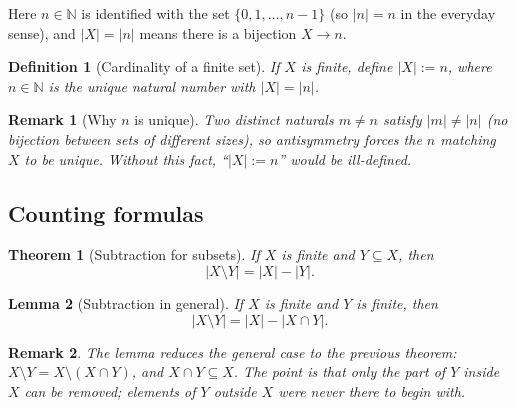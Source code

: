 \documentclass[11pt]{article}
\theoremstyle{defstyle}
\newtheorem{definition}{Definition}[section]
\theoremstyle{thmstyle}
\newtheorem{theorem}{Theorem}[section]
\newtheorem{lemma}[theorem]{Lemma}
\theoremstyle{notstyle}
\newtheorem*{remark}{Remark}
\theoremstyle{cautionstyle}
\newcommand{\N}{\mathbb{N}}
\newcommand{\card}[1]{\lvert #1 \rvert}
\begin{document}
Here $n \in \N$ is identified with the set $\{0, 1, \dots, n-1\}$ (so
$\card{n} = n$ in the everyday sense), and $\card{X} = \card{n}$ means there
is a bijection $X \to n$.

\begin{defbox}
\begin{definition}[Cardinality of a finite set]
If $X$ is finite, define $\card{X} := n$, where $n \in \N$ is the unique
natural number with $\card{X} = \card{n}$.
\end{definition}
\end{defbox}

\begin{notebox}
\begin{remark}[Why $n$ is unique]
Two distinct naturals $m \neq n$ satisfy $\card{m} \neq \card{n}$ (no
bijection between sets of different sizes), so antisymmetry forces the $n$
matching $X$ to be unique. Without this fact, ``$\card{X} := n$'' would be
ill-defined.
\end{remark}
\end{notebox}

\subsection*{Counting formulas}

\begin{thmbox}
\begin{theorem}[Subtraction for subsets]
If $X$ is finite and $Y \subseteq X$, then
\[
  \card{X \setminus Y} = \card{X} - \card{Y}.
\]
\end{theorem}
\end{thmbox}

\begin{thmbox}
\begin{lemma}[Subtraction in general]
If $X$ is finite and $Y$ is finite, then
\[
  \card{X \setminus Y} = \card{X} - \card{X \cap Y}.
\]
\end{lemma}
\end{thmbox}

\begin{notebox}
\begin{remark}
The lemma reduces the general case to the previous theorem: $X \setminus Y =
X \setminus (X \cap Y)$, and $X \cap Y \subseteq X$. The point is that only
the part of $Y$ \emph{inside} $X$ can be removed; elements of $Y$ outside $X$
were never there to begin with.
\end{remark}
\end{notebox}
\end{document}
